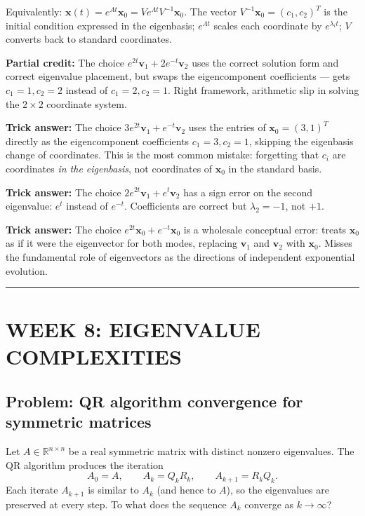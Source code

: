 \documentclass[12pt]{amsart}
\newcommand{\divider}{
  \vspace{-1em}
  \noindent
  \raisebox{-0.15ex}{\textbullet}%
  \hspace{0.5em}%
  \rule[0.5ex]{0.95\textwidth}{1.0pt}%
  \hspace{0.5em}%
  \raisebox{-0.15ex}{\textbullet}%
  \vspace{0em}
}
\begin{document}
Equivalently: $\mathbf{x}(t) = e^{At}\mathbf{x}_0 = V e^{\Lambda t} V^{-1}\mathbf{x}_0$.
The vector $V^{-1}\mathbf{x}_0 = (c_1, c_2)^T$ is the initial condition
expressed in the eigenbasis; $e^{\Lambda t}$ scales each coordinate by
$e^{\lambda_i t}$; $V$ converts back to standard coordinates.

\textbf{Partial credit:}
The choice $e^{2t}\mathbf{v}_1 + 2 e^{-t}\mathbf{v}_2$ uses the correct
solution form and correct eigenvalue placement, but swaps the eigencomponent
coefficients --- gets $c_1 = 1, c_2 = 2$ instead of $c_1 = 2, c_2 = 1$.
Right framework, arithmetic slip in solving the $2 \times 2$ coordinate
system.

\textbf{Trick answer:}
The choice $3 e^{2t}\mathbf{v}_1 + e^{-t}\mathbf{v}_2$ uses the entries of
$\mathbf{x}_0 = (3,1)^T$ directly as the eigencomponent coefficients
$c_1 = 3, c_2 = 1$, skipping the eigenbasis change of coordinates. This is
the most common mistake: forgetting that $c_i$ are coordinates \emph{in
the eigenbasis}, not coordinates of $\mathbf{x}_0$ in the standard basis.

\textbf{Trick answer:}
The choice $2 e^{2t}\mathbf{v}_1 + e^{t}\mathbf{v}_2$ has a sign error on
the second eigenvalue: $e^t$ instead of $e^{-t}$. Coefficients are correct
but $\lambda_2 = -1$, not $+1$.

\textbf{Trick answer:}
The choice $e^{2t}\mathbf{x}_0 + e^{-t}\mathbf{x}_0$ is a wholesale
conceptual error: treats $\mathbf{x}_0$ as if it were the eigenvector for
both modes, replacing $\mathbf{v}_1$ and $\mathbf{v}_2$ with $\mathbf{x}_0$.
Misses the fundamental role of eigenvectors as the directions of independent
exponential evolution.

\divider

\section*{WEEK 8: EIGENVALUE COMPLEXITIES}

\subsection*{Problem: QR algorithm convergence for symmetric matrices}

Let $A \in \mathbb{R}^{n \times n}$ be a real symmetric matrix with distinct
nonzero eigenvalues. The QR algorithm produces the iteration
$$A_0 = A, \qquad A_k = Q_k R_k, \qquad A_{k+1} = R_k Q_k.$$
Each iterate $A_{k+1}$ is similar to $A_k$ (and hence to $A$), so the
eigenvalues are preserved at every step. To what does the sequence $A_k$
converge as $k \to \infty$?
\end{document}
